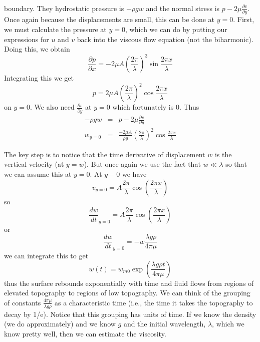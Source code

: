 \documentclass[12pt,twoside]{article}
\begin{document}
boundary.   They hydrostatic pressure is $-\rho g w$ and the normal stress is
$p - 2\mu \frac{\partial v}{\partial y}$.   Once again because the
displacements are small, this can be done at $y=0$.   First, we must calculate
the pressure at $y=0$, which we can do by putting our expressions for $u$ and
$v$ back into the viscous flow equation (not the biharmonic).   Doing this, we
obtain
\begin{equation}
\frac{\partial p}{\partial x} = -2 \mu A \left ( \frac{2 \pi}{\lambda} \right
)^3 \sin \frac{2 \pi x}{\lambda}
\end{equation}
Integrating this we get
\begin{equation}
p = 2 \mu A \left ( \frac{2 \pi}{\lambda} \right
)^2 \cos \frac{2 \pi x}{\lambda}
\end{equation}
on $y=0$.  We also need $\frac{\partial v}{\partial y}$ at $y=0$ which
fortunately is $0$.  Thus
\begin{eqnarray}
-\rho g w & = & p - 2\mu \frac{\partial v}{\partial y}\\
w_{y=0} & = & \frac{-2 \mu A}{\rho g} \left ( \frac{2 \pi}{\lambda} \right )^2
\cos\frac{2 \pi x}{\lambda}
\end{eqnarray}

The key step is to notice that the time derivative of displacement $w$ is the
vertical velocity (at $y=w$).  But once again we use the fact that $w \ll
\lambda$ so that we can assume this at $y=0$.   At $y-0$ we have
\begin{equation}
v_{y=0} = A \frac{2 \pi}{\lambda}
\cos \left (\frac{2 \pi x}{\lambda} \right ) 
\end{equation}
so
\begin{equation} 
\frac{d w}{dt}_{y=0} = A \frac{2 \pi}{\lambda}
\cos \left (\frac{2 \pi x}{\lambda} \right ) 
\end{equation}
or
\begin{equation} 
\frac{d w}{dt}_{y=0} = -w \frac{\lambda g \rho}{4 \pi \mu}
\end{equation} 
we can integrate this to get
\begin{equation}
w(t) = w_{m0} \exp \left ( \frac{\lambda g \rho t}{4 \pi \mu} \right )
\end{equation}
thus the surface rebounds exponentially with time and fluid flows from regions
of elevated topography to regions of low topography.  We can think of the
grouping of constants $ \frac{4 \pi \mu}{\lambda g \rho} $ as a characteristic
time (i.e., the time it takes the topography to decay by 1/e).  Notice that
this grouping has units of time.   If we know the density (we do approximately)
and we know $g$ and the initial wavelength, $\lambda$, which we know pretty
well, then we can estimate the viscosity.
\end{document}
